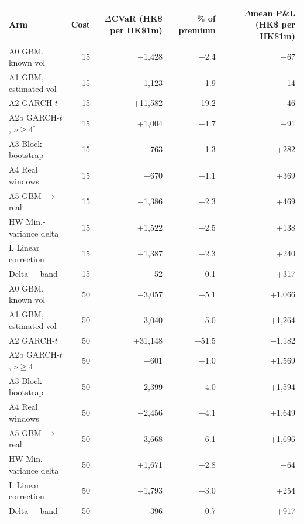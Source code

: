 \begin{tabular}{lrrrr}
\toprule
Arm & Cost & $\Delta$CVaR (HK\$ per HK\$1m) & \% of premium & $\Delta$mean P\&L (HK\$ per HK\$1m) \\
\midrule
A0 GBM{,} known vol & 15 & $-$1{,}428 & $-$2.4 & $-$67 \\
A1 GBM{,} estimated vol & 15 & $-$1{,}123 & $-$1.9 & $-$14 \\
A2 GARCH-$t$ & 15 & +11{,}582 & +19.2 & +46 \\
A2b GARCH-$t${,} $\nu\ge4$$^\dagger$ & 15 & +1{,}004 & +1.7 & +91 \\
A3 Block bootstrap & 15 & $-$763 & $-$1.3 & +282 \\
A4 Real windows & 15 & $-$670 & $-$1.1 & +369 \\
A5 GBM $\to$ real & 15 & $-$1{,}386 & $-$2.3 & +469 \\
HW Min.-variance delta & 15 & +1{,}522 & +2.5 & +138 \\
L Linear correction & 15 & $-$1{,}387 & $-$2.3 & +240 \\
Delta + band & 15 & +52 & +0.1 & +317 \\
A0 GBM{,} known vol & 50 & $-$3{,}057 & $-$5.1 & +1{,}066 \\
A1 GBM{,} estimated vol & 50 & $-$3{,}040 & $-$5.0 & +1{,}264 \\
A2 GARCH-$t$ & 50 & +31{,}148 & +51.5 & $-$1{,}182 \\
A2b GARCH-$t${,} $\nu\ge4$$^\dagger$ & 50 & $-$601 & $-$1.0 & +1{,}569 \\
A3 Block bootstrap & 50 & $-$2{,}399 & $-$4.0 & +1{,}594 \\
A4 Real windows & 50 & $-$2{,}456 & $-$4.1 & +1{,}649 \\
A5 GBM $\to$ real & 50 & $-$3{,}668 & $-$6.1 & +1{,}696 \\
HW Min.-variance delta & 50 & +1{,}671 & +2.8 & $-$64 \\
L Linear correction & 50 & $-$1{,}793 & $-$3.0 & +254 \\
Delta + band & 50 & $-$396 & $-$0.7 & +917 \\
\bottomrule
\end{tabular}
